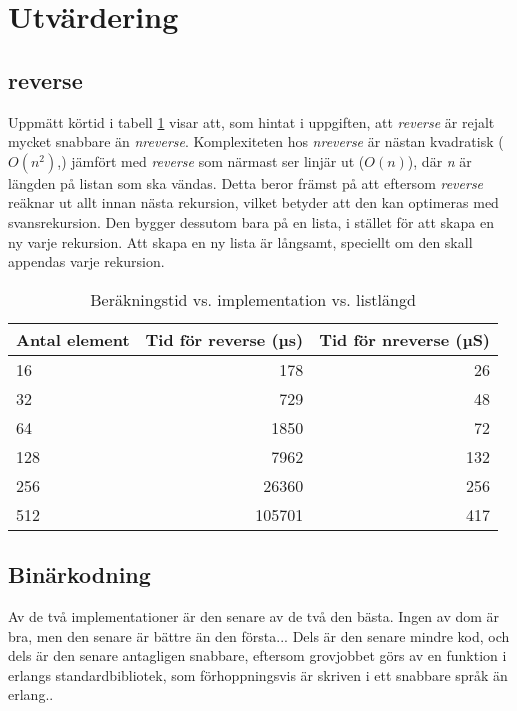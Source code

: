 \documentclass[a4paper, 11pt]{article}
\begin{document}
\section{Utvärdering}

\subsection{reverse}

Uppmätt körtid i tabell \ref{tab:reverse} visar att, som hintat i uppgiften, att \emph{reverse} är rejalt mycket snabbare än \emph{nreverse}. Komplexiteten hos \emph{nreverse} är nästan kvadratisk ($O(n^2)$,) jämfört med \emph{reverse} som närmast ser linjär ut ($O(n)$), där \emph{n} är längden på listan som ska vändas. Detta beror främst på att eftersom \emph{reverse} reäknar ut allt innan nästa rekursion, vilket betyder att den kan optimeras med svansrekursion. Den bygger dessutom bara på en lista, i stället för att skapa en ny varje rekursion. Att skapa en ny lista är långsamt, speciellt om den skall appendas varje rekursion.

\begin{table}
\centering
\begin{tabular}{|l|r|r|}
\hline
Antal element & Tid för reverse (µs) & Tid för nreverse (µS)\\
\hline
16 & 178 & 26 \\
\hline
32 & 729 & 48 \\
\hline
64 & 1850 & 72 \\
\hline
128 & 7962 & 132 \\
\hline
256 & 26360 & 256 \\
\hline
512 & 105701 & 417 \\
\hline
\end{tabular}
\caption{Beräkningstid vs. implementation vs. listlängd}
\label{tab:reverse}
\end{table}



\subsection{Binärkodning}

Av de två implementationer är den senare av de två den bästa. Ingen av dom är bra, men den senare är bättre än den första... Dels är den senare mindre kod, och dels är den senare antagligen snabbare, eftersom grovjobbet görs av en funktion i erlangs standardbibliotek, som förhoppningsvis är skriven i ett snabbare språk än erlang..
\end{document}
